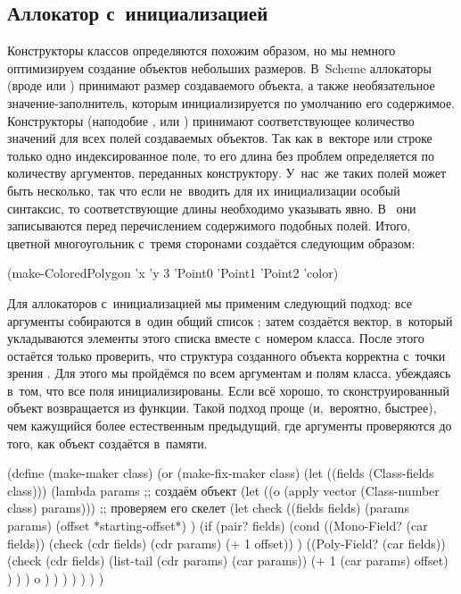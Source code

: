 \subsection{Аллокатор с~инициализацией}\label{objects/accomp/ssect:maker}

Конструкторы классов определяются похожим образом, но мы немного оптимизируем
создание объектов небольших размеров. В~Scheme аллокаторы (вроде
 или ) принимают размер создаваемого объекта,
а также необязательное значение-заполнитель, которым инициализируется по
умолчанию его содержимое. Конструкторы (наподобие ,  или
) принимают соответствующее количество значений для всех полей
создаваемых объектов. Так как в~векторе или строке только одно индексированное
поле, то его длина без проблем определяется по количеству аргументов, переданных
конструктору. У~нас~же таких полей может быть несколько, так что если не~вводить
для их инициализации особый синтаксис, то соответствующие длины необходимо
указывать явно. В~{\Meroonet} они записываются перед перечислением содержимого
подобных полей. Итого, цветной многоугольник с~тремя сторонами создаётся
следующим образом:

\begin{code:lisp}
(make-ColoredPolygon 'x 'y 3 'Point0 'Point1 'Point2 'color)
\end{code:lisp}

Для аллокаторов с~инициализацией мы применим следующий подход: все аргументы
собираются в~один общий список ; затем создаётся вектор, в~который
укладываются элементы этого списка вместе с~номером класса. После этого остаётся
только проверить, что структура созданного объекта корректна с~точки зрения
{\Meroonet}. Для этого мы пройдёмся по всем аргументам и полям класса, убеждаясь
в~том, что все поля инициализированы. Если всё хорошо, то сконструированный
объект возвращается из функции. Такой подход проще (и,~вероятно, быстрее), чем
кажущийся более естественным предыдущий, где аргументы проверяются до того,
как объект создаётся в~памяти.

\begin{code:lisp}
(define (make-maker class)
  (or (make-fix-maker class)
      (let ((fields (Class-fields class)))
        (lambda params
          ;; создаём объект
          (let ((o (apply vector (Class-number class) params)))
            ;; проверяем его скелет
            (let check ((fields fields)
                        (params params)
                        (offset *starting-offset*) )
              (if (pair? fields)
                  (cond ((Mono-Field? (car fields))
                         (check (cdr fields) (cdr params) (+ 1 offset)) )
                        ((Poly-Field? (car fields))
                         (check (cdr fields)
                                (list-tail (cdr params) (car params))
                                (+ 1 (car params) offset) ) ) )
                  o ) ) ) ) ) ) )
\end{code:lisp}

